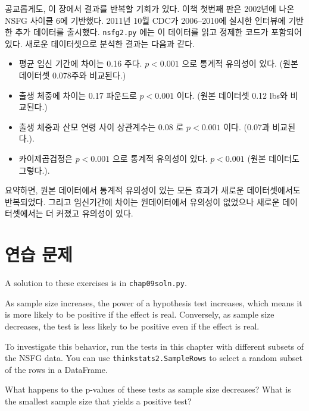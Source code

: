 공교롭게도, 이 장에서 결과를 반복할 기회가 있다.
이책 첫번째 판은 2002년에 나온 NSFG 사이클 6에 기반했다.
2011년 10월 CDC가 2006--2010에 실시한 인터뷰에 기반한 추가 데이터를 출시했다. {\tt nsfg2.py} 에는 이 데이터를 읽고 정제한 코드가 포함되어 있다. 새로운 데이터셋으로 분석한 결과는 다음과 같다.

\begin{itemize}

\item 평균 임신 기간에 차이는 0.16 주다. $p < 0.001$ 으로 통계적 유의성이 있다. (원본 데이터셋 0.078주와 비교된다.)


\item 출생 체중에 차이는 0.17 파운드로 $p < 0.001$ 이다.
(원본 데이터셋 0.12 lbs와 비교된다.)

\item 출생 체중과 산모 연령 사이 상관계수는 0.08 로 $p < 0.001$ 이다. (0.07과 비교된다.).

\item 카이제곱검정은 $p < 0.001$ 으로 통계적 유의성이 있다.
$p < 0.001$ (원본 데이터도 그렇다.).

\end{itemize}

요약하면, 원본 데이터에서 통계적 유의성이 있는 모든 효과가 새로운 데이터셋에서도 반복되었다. 그리고 임신기간에 차이는 원데이터에서 유의성이 없었으나 새로운 데이터셋에서는 더 커졌고 유의성이 있다.


\section{연습 문제}

A solution to these exercises is in \verb"chap09soln.py".

\begin{exercise}
As sample size increases, the power of a hypothesis test increases,
which means it is more likely to be positive if the effect is real.
Conversely, as sample size decreases, the test is less likely to
be positive even if the effect is real.

To investigate this behavior, run the tests in this chapter with
different subsets of the NSFG data.  You can use {\tt thinkstats2.SampleRows}
to select a random subset of the rows in a DataFrame.

What happens to the p-values of these tests as sample size decreases?
What is the smallest sample size that yields a positive test?
\end{exercise}



